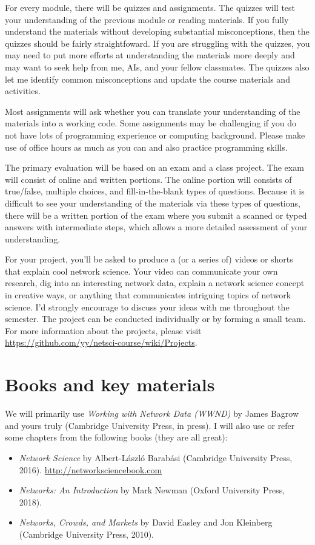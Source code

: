 \documentclass[11pt,article,oneside]{memoir} %
\begin{document}
For every module, there will be quizzes and assignments. The quizzes will test your understanding of the previous module or reading materials. If you fully understand the materials without developing substantial misconceptions, then the quizzes should be fairly straightfoward. If you are struggling with the quizzes, you may need to put more efforts at understanding the materials more deeply and may want to seek help from me, AIs, and your fellow classmates. The quizzes also let me identify common misconceptions and update the course materials and activities. 

Most assignments will ask whether you can translate your understanding of the materials into a working code. Some assignments may be challenging if you do not have lots of programming experience or computing background. Please make use of office hours as much as you can and also practice programming skills. 

The primary evaluation will be based on an exam and a class project.
The exam will consist of online and written portions. The online portion will consists of true/false, multiple choices, and fill-in-the-blank types of questions.  
Because it is difficult to see your understanding of the materials via these types of questions, there will be a written portion of the exam where you submit a scanned or typed answers with intermediate steps, which allows a more detailed assessment of your understanding.  

For your project, you'll be asked to produce a (or a series of) videos or shorts that explain cool network science. Your video can communicate your own research, dig into an interesting network data, explain a network science concept in creative ways, or anything that communicates intriguing topics of network science. I'd strongly encourage to discuss your ideas with me throughout the semester. 
The project can be conducted individually or by forming a small team.
For more information about the projects, please visit \url{https://github.com/yy/netsci-course/wiki/Projects}.

\section{Books and key materials} %

We will primarily use \emph{Working with Network Data (WWND)} by James Bagrow and yours truly (Cambridge University Press, in press). I will also use or refer some chapters from the following books (they are all great):
\begin{itemize}
  \item \emph{Network Science} by Albert-László Barabási (Cambridge University Press, 2016). \url{http://networksciencebook.com}
  \item \emph{Networks: An Introduction} by Mark Newman (Oxford University Press, 2018).
  \item \emph{Networks, Crowds, and Markets} by David Easley and Jon Kleinberg (Cambridge University Press, 2010).
\end{itemize}
\end{document}

